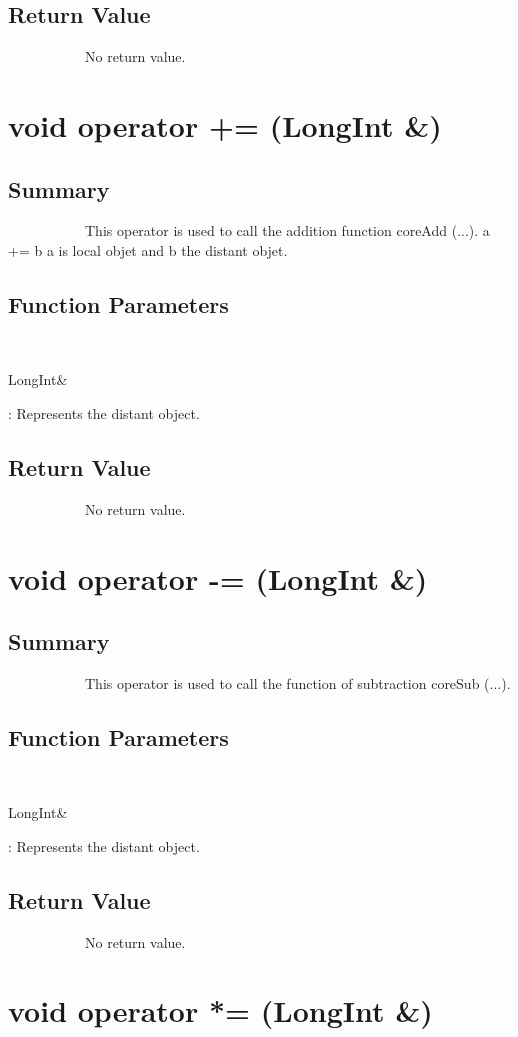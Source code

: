 \documentclass[11pt]{report}
\begin{document}
\subsection{Return Value}
~~~~~~~~~~~No return value.

\section{ void operator += (LongInt \&)}
	\subsection{Summary}
~~~~~~~~~~~This operator is used to call the addition function coreAdd (...). 
a += b  a is local objet and b the distant objet.
	\subsection{Function Parameters}
~~~~~~~~~~~\begin{bf}LongInt\&\end{bf}:  Represents the distant object.

\subsection{Return Value}
~~~~~~~~~~~No return value.

\section{ void operator -= (LongInt \&)}
	\subsection{Summary}
~~~~~~~~~~~This operator is used to call the function of subtraction coreSub (...).
	\subsection{Function Parameters}
~~~~~~~~~~~\begin{bf}LongInt\&\end{bf}: Represents the distant object.
\subsection{Return Value}
~~~~~~~~~~~No return value.


\section{ void operator *= (LongInt \&)}
\end{document}
